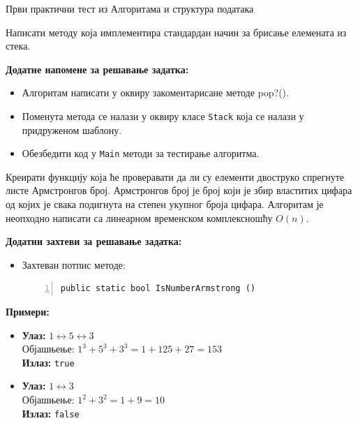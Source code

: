 
Први практични тест из Алгоритама и структура података

Написати методу која имплементира стандардан начин за брисање елемената из стека.

\textbf{Додатне напомене за решавање задатка:}
\begin{itemize}
    \item Алгоритам написати у оквиру закоментарисане методе pop?().
    \item Поменута метода се налази у оквиру класе \texttt{Stack} која се налази у придруженом шаблону.
    \item Обезбедити код у \texttt{Main} методи за тестирање алгоритма.
\end{itemize}



Креирати функцију која ће проверавати да ли су елементи двоструко спрегнуте листе Армстронгов број. Армстронгов број је број који је збир властитих цифара од којих је свака подигнута на степен укупног броја цифара. Алгоритам је неопходно написати са линеарном временском комплексношћу $O(n)$.

\textbf{Додатни захтеви за решавање задатка:}
\begin{itemize}
    \item Захтеван потпис методе:
    \begin{Verbatim}[fontsize=\footnotesize, numbers=left, xleftmargin=10mm]
public static bool IsNumberArmstrong ()
    \end{Verbatim}
\end{itemize}

\textbf{Примери:}
\begin{itemize}
    \item \textbf{Улаз:} $1 \leftrightarrow 5 \leftrightarrow 3$ \\
          Објашњење: $1^3 + 5^3 + 3^3 = 1 + 125 + 27 = 153$ \\
          \textbf{Излаз:} \texttt{true}
    \item \textbf{Улаз:} $1 \leftrightarrow 3$ \\
          Објашњење: $1^2 + 3^2 = 1 + 9 = 10$ \\
          \textbf{Излаз:} \texttt{false}
\end{itemize}



